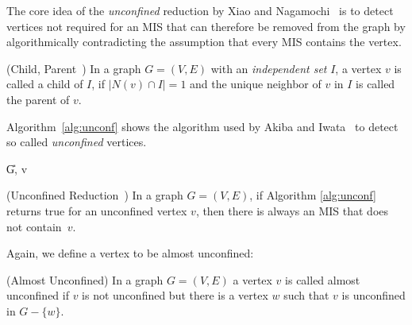 \documentclass[a4paper,UKenglish,cleveref, autoref, thm-restate]{lipics-v2021}
\begin{document}
The core idea of the \emph{unconfined} reduction by Xiao and
Nagamochi~\cite{XiaoUnconfined} is to detect vertices not required for an MIS
that can therefore be removed from the graph by algorithmically
contradicting the assumption that every MIS contains the vertex.

\begin{definition} (Child, Parent~\cite{XiaoUnconfined}) In a graph $G=(V,E)$ with an \textit{independent set} $I$, a vertex $v$ is called a child of $I$, if $|N(v)\cap I| = 1$ and the unique neighbor of $v$ in $I$ is called the parent of $v$.
\end{definition}

Algorithm~\ref{alg:unconf} shows the algorithm used by Akiba and
Iwata~\cite{AkibaIwata} to detect so called \textit{unconfined}
vertices.

\begin{algorithm}[t]
	\caption{Unconfined -- Xiao and Nagamochi
      \cite{XiaoUnconfined}}\label{alg:unconf}
	\DontPrintSemicolon
	
	\U{G, v}	
	
	
\end{algorithm}


\begin{theorem}(Unconfined Reduction~\cite{XiaoUnconfined}) In a graph $G=(V,E)$,
  if Algorithm \ref{alg:unconf} returns true for an unconfined vertex $v$, then
  there is always an MIS that does not contain~$v$.
\end{theorem}

Again, we define a vertex to be almost unconfined:

\begin{definition} (Almost Unconfined)
  In a graph $G=(V,E)$ a vertex $v$ is called almost unconfined if $v$ is not unconfined but there is a vertex $w$ such that $v$ is unconfined in $G-\{w\}$.
\end{definition}
\end{document}
